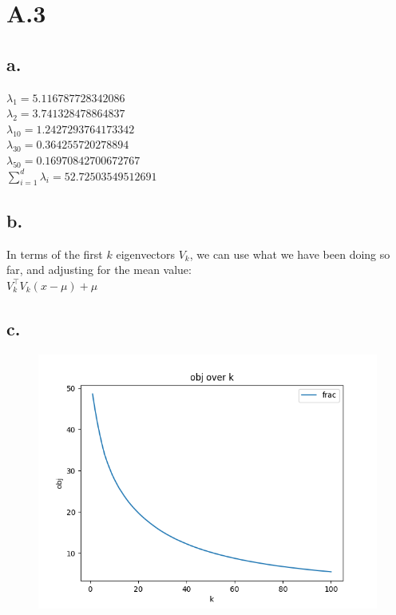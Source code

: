 \documentclass{article}
\newcommand{\1}{\mathbf{1}}
\begin{document}
\section*{A.3}
{\Large 

\subsection*{a.}

$\lambda_1 = 5.116787728342086$ \\
$\lambda_2 = 3.741328478864837$ \\
$\lambda_{10} = 1.2427293764173342$ \\
$\lambda_{30} = 0.364255720278894$ \\
$\lambda_{50} = 0.16970842700672767$ \\
$\sum_{i=1}^d{\lambda_i} = 52.72503549512691$

\subsection*{b.}


In terms of the first $k$ eigenvectors $V_k$, we can use what we have been doing so far, and adjusting for the mean value: \\
$V_k^\top V_k (x - \mu) + \mu$

\subsection*{c.}

\begin{figure}[h]
  \centering
  \includegraphics[width=130mm]{../hw4-code/results/a3_cobj.png}
\end{figure}

}
\end{document}

